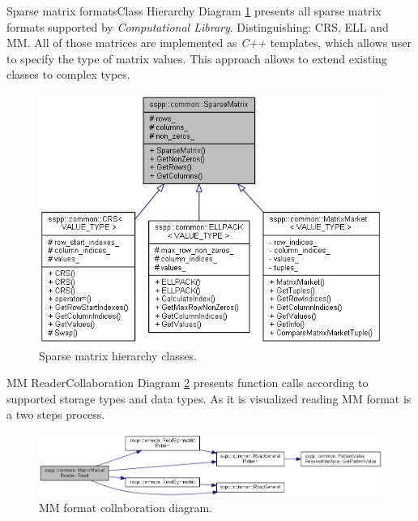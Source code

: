 		\begin{design-element}{Sparse matrix formats}{Class Hierarchy}
			Diagram \ref{fig:sparse-matrices} presents all sparse matrix formats supported by \emph{Computational Library}. Distinguishing: \gls{CRS}, \gls{ELL} and \gls{MM}. All of those matrices are implemented as \emph{C++} templates, which allows user to specify the type of matrix values. This approach allows to extend existing classes to complex types.
			\begin{figure}[!hp]
				\centering
				\includegraphics[scale=0.6]{others/img/sparse}
				\caption{Sparse matrix hierarchy classes.}
				\label{fig:sparse-matrices}
			\end{figure}
		\end{design-element}
	
		\begin{design-element}{\glsdesc{MM} Reader}{Collaboration}
			Diagram \ref{fig:mm-reader} presents function calls according to supported storage types and data types. As it is visualized reading \gls{MM} format is a two steps process. 
			\begin{figure}[!hp]
				\centering
				\includegraphics[width=\textwidth]{others/img/matrix-market-reader}
				\caption{\glsdesc{MM} format collaboration diagram.}
				\label{fig:mm-reader}
			\end{figure}
		\end{design-element}
	
